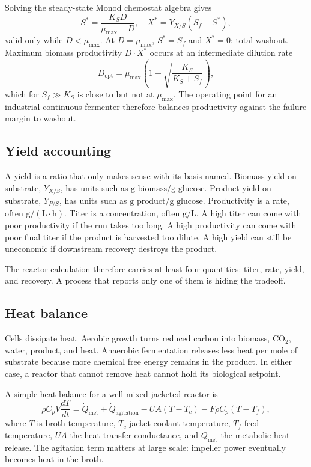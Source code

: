 Solving the steady-state Monod chemostat algebra gives
\[
S^\ast = \frac{K_S D}{\mu_{\max} - D},
\quad
X^\ast = Y_{X/S}(S_f - S^\ast),
\]
valid only while $D < \mu_{\max}$. At $D = \mu_{\max}$, $S^\ast = S_f$
and $X^\ast = 0$: total washout. Maximum biomass productivity
$D \cdot X^\ast$ occurs at an intermediate dilution rate
\[
D_{\text{opt}} = \mu_{\max}\left(1 - \sqrt{\frac{K_S}{K_S + S_f}}\right),
\]
which for $S_f \gg K_S$ is close to but not at $\mu_{\max}$. The
operating point for an industrial continuous fermenter therefore
balances productivity against the failure margin to washout.

\subsection{Yield accounting}

A yield is a ratio that only makes sense with its basis named. Biomass
yield on substrate, $Y_{X/S}$, has units such as
$\text{g biomass}/\text{g glucose}$. Product yield on substrate,
$Y_{P/S}$, has units such as $\text{g product}/\text{g glucose}$.
Productivity is a rate, often $\text{g}/(\text{L}\cdot\text{h})$.
Titer is a concentration, often $\text{g}/\text{L}$. A high titer can
come with poor productivity if the run takes too long. A high
productivity can come with poor final titer if the product is harvested
too dilute. A high yield can still be uneconomic if downstream recovery
destroys the product.

The reactor calculation therefore carries at least four quantities:
titer, rate, yield, and recovery. A process that reports only one of
them is hiding the tradeoff.

\subsection{Heat balance}

Cells dissipate heat. Aerobic growth turns reduced carbon into biomass,
CO$_2$, water, product, and heat. Anaerobic fermentation releases less
heat per mole of substrate because more chemical free energy remains in
the product. In either case, a reactor that cannot remove heat cannot
hold its biological setpoint.



A simple heat balance for a well-mixed jacketed reactor is
\[
\rho C_p V \frac{dT}{dt}
= \dot{Q}_{\text{met}} + \dot{Q}_{\text{agitation}}
- U A (T - T_c) - F\rho C_p (T - T_f),
\]
where $T$ is broth temperature, $T_c$ jacket coolant temperature, $T_f$
feed temperature, $U A$ the heat-transfer conductance, and
$\dot{Q}_{\text{met}}$ the metabolic heat release. The agitation term
matters at large scale: impeller power eventually becomes heat in the
broth.

